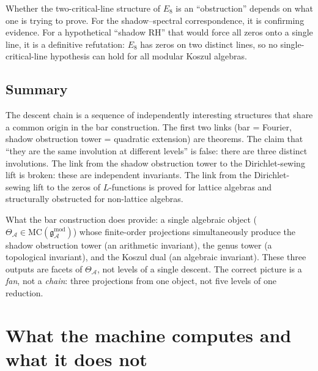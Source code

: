 \documentclass[11pt]{article}
\newcommand{\cA}{\mathcal{A}}
\newcommand{\gAmod}{\mathfrak{g}^{\mathrm{mod}}_\cA}
\begin{document}
Whether the two-critical-line structure of $E_8$ is an
``obstruction'' depends on what one is trying to prove.  For the
shadow--spectral correspondence, it is confirming evidence.  For a
hypothetical ``shadow RH'' that would force all zeros onto a single
line, it is a definitive refutation: $E_8$ has zeros on two distinct
lines, so no single-critical-line hypothesis can hold for all
modular Koszul algebras.

\subsection{Summary}

The descent chain is a sequence of independently interesting
structures that share a common origin in the bar construction.
The first two links (bar = Fourier, shadow obstruction tower = quadratic
extension) are theorems.  The claim that ``they are the same
involution at different levels'' is false: there are three
distinct involutions.  The link from the shadow obstruction tower to the
Dirichlet-sewing lift is broken: these are independent invariants.
The link from the Dirichlet-sewing lift to the zeros of $L$-functions
is proved for lattice algebras and structurally obstructed for
non-lattice algebras.

What the bar construction does provide: a single algebraic object
($\Theta_\cA \in \mathrm{MC}(\gAmod)$) whose finite-order
projections simultaneously produce the shadow obstruction tower (an arithmetic
invariant), the genus tower (a topological invariant), and the
Koszul dual (an algebraic invariant).  These three outputs are
facets of $\Theta_\cA$, not levels of a single descent.  The
correct picture is a \emph{fan}, not a \emph{chain}: three
projections from one object, not five levels of one reduction.

\begin{center}
\end{center}


\section{What the machine computes and what it does not}
\label{sec:honest-scope}
\end{document}
